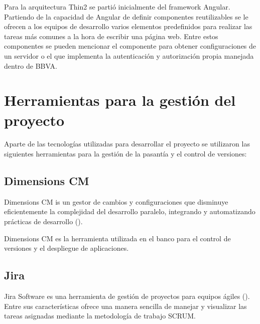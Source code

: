 Para la arquitectura Thin2 se partió inicialmente del framework Angular. Partiendo
de la capacidad de Angular de definir componentes reutilizables se le ofrecen a los
equipos de desarrollo varios elementos predefinidos para realizar las tareas más
comunes a la hora de escribir una página web. Entre estos componentes se pueden
mencionar el componente para obtener configuraciones de un servidor o el que implementa
la autenticación y autorización propia manejada dentro de BBVA.

\section{Herramientas para la gestión del proyecto}

Aparte de las tecnologías utilizadas para desarrollar el proyecto se utilizaron
las siguientes herramientas para la gestión de la pasantía y el control de versiones:

\subsection{Dimensions CM}

Dimensions CM is un gestor de cambios y configuraciones que disminuye eficientemente
la complejidad del desarrollo paralelo, integrando y automatizando prácticas de desarrollo
(\cite{DIMENSIONS}).

Dimensions CM es la herramienta utilizada en el banco para el control de versiones y
el despliegue de aplicaciones.

\subsection{Jira}

Jira Software es una herramienta de gestión de proyectos para equipos ágiles (\cite{JIRA}).
Entre sus características ofrece una manera sencilla de manejar y visualizar
las tareas asignadas mediante la metodología de trabajo SCRUM.
